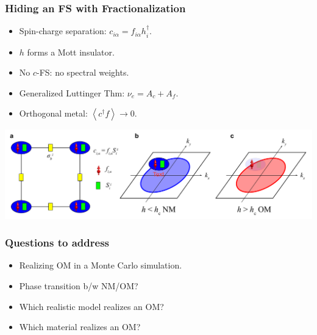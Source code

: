 \documentclass[xcolor=table, 10pt, aspectratio=43]{beamer}
\begin{document}
\begin{frame}
  \frametitle{Hiding an FS with Fractionalization}
  \begin{itemize}
    \item Spin-charge separation: $c_{i\alpha} = f_{i\alpha} h_i^\dagger$.
		\item $h$ forms a Mott insulator.
		\item No $c$-FS: no spectral weights.
		\item Generalized Luttinger Thm:
		$\nu_e = A_c + A_f$.
		\item Orthogonal metal: $\left<c^\dagger f\right>\rightarrow 0$.
  \end{itemize}
	\begin{center}
		\includegraphics[width=.8\textwidth]{hide_fs}
	\end{center}
\end{frame}

\begin{frame}
	\frametitle{Questions to address}
	\begin{itemize}
		\item[\ding{51}] Realizing OM in a Monte Carlo simulation.
		\item[\ding{51}] Phase transition b/w NM/OM?
		\item[\ding{55}] Which realistic model realizes an OM?
		\item[\ding{55}] Which material realizes an OM?
	\end{itemize}

\end{frame}
\end{document}
